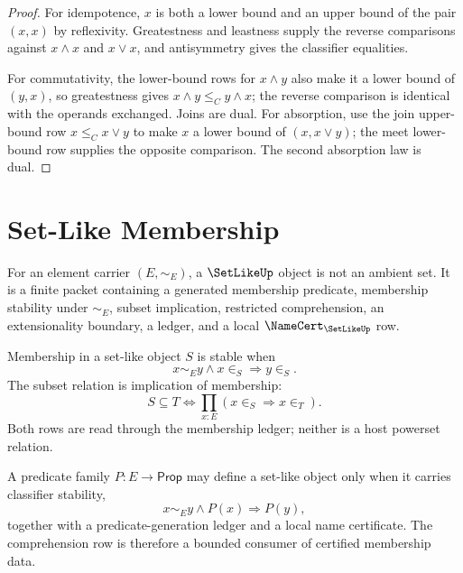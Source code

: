 \begin{proof}
For idempotence, $x$ is both a lower bound and an upper bound of the pair
$(x,x)$ by reflexivity.  Greatestness and leastness supply the reverse
comparisons against $x\wedge x$ and $x\vee x$, and antisymmetry gives the
classifier equalities.

For commutativity, the lower-bound rows for $x\wedge y$ also make it a lower
bound of $(y,x)$, so greatestness gives $x\wedge y\le_C y\wedge x$; the
reverse comparison is identical with the operands exchanged.  Joins are
dual.  For absorption, use the join upper-bound row $x\le_C x\vee y$ to make
$x$ a lower bound of $(x,x\vee y)$; the meet lower-bound row supplies the
opposite comparison.  The second absorption law is dual.
\end{proof}

\section{Set-Like Membership}
\label{sec:order-set-type-setlike}

\begin{definition}
\label{def:order-set-type-setlike}
For an element carrier $(E,\sim_E)$, a $\SetLikeUp$ object is not an ambient
set.  It is a finite packet containing a generated membership predicate,
membership stability under $\sim_E$, subset implication, restricted
comprehension, an extensionality boundary, a ledger, and a local
$\NameCert_{\SetLikeUp}$ row.
\end{definition}

\begin{definition}
\label{def:order-set-type-membership-subset}
Membership in a set-like object $S$ is stable when
$$
x\sim_E y\wedge x\in_S\Longrightarrow y\in_S.
$$
The subset relation is implication of membership:
$$
S\subseteq T
\Longleftrightarrow
\prod_{x:E}(x\in_S\Longrightarrow x\in_T).
$$
Both rows are read through the membership ledger; neither is a host powerset
relation.
\end{definition}

\begin{definition}
\label{def:order-set-type-restricted-comprehension}
A predicate family $P:E\to\mathsf{Prop}$ may define a set-like object only
when it carries classifier stability,
$$
x\sim_E y\wedge P(x)\Longrightarrow P(y),
$$
together with a predicate-generation ledger and a local name certificate.
The comprehension row is therefore a bounded consumer of certified
membership data.
\end{definition}

